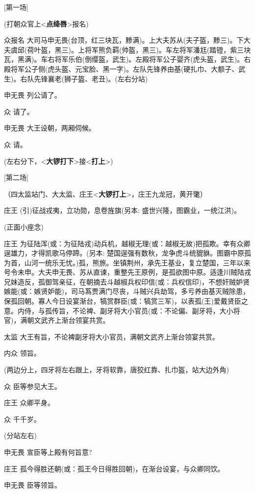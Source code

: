 {[}第一场{]}

(打朝众官上\textless{}\textbf{点绛唇}\textgreater{}报名)

众报名
大司马申无畏(台顶，红三块瓦，黪满)。上大夫苏从(夫子盔，黪三)。下大夫虞邱(荷叶盔，黑三)。上将军熊负羁(帅盔，黑三)。车左将军潘尪(踏镫，紫三块瓦，黑满)。车右将军乐伯(倒缨盔，武生)。左殿将军公子婴齐(虎头盔，武生)。右殿将军公子侧(虎头盔、元宝脸、黑一字)。左队先锋养由基(硬扎巾、大额子、武生)。右队先锋襄老(狮子盔、老丑)。(左右分站)

申无畏 列公请了。

众 请了。

申无畏 大王设朝，两厢伺候。

众 请。

(左右分下，\textless{}\textbf{大锣打下}\textgreater{}接\textless{}\textbf{打上}\textgreater{})

{[}第二场{]}

（四太监站门、大太监、庄王\textless{}\textbf{大锣打上}\textgreater{}，庄王九龙冠，黄开氅）

庄王 (引)征战戎夷，立功勋，息卷旌旗(另本: 盛世兴隆，图霸业，一统江洪)。

(正面小座念)

庄王
为征陆浑(或：为征陆戎)动兵机，越椒无理(或：越椒无故)把孤欺。幸有众卿逞雄力，才得凯歌马停蹄。(另本:
楚国逞强有数秋，龙争虎斗统貔貅。图霸中原孤为首，山河一统乐无忧。)孤，熊旅。坐镇荆州，承先王基业，复立楚国，三年以来号令未申。大夫申无畏、苏从直谏，重整先王原例，是孤欲图中原。适逢川贼陆戎兄妹造反，孤御驾亲征，在朝摘去斗越椒兵权印信(或：兵权信印)，不想奸贼妒贤嫉能(或：嫉贤妒能)，司马蒍贾满门尽丧，斗贼兴兵劫驾，多亏养由基灭贼除患，保孤回朝。寡人今日设宴渐台，犒赏群臣(或：犒赏三军)，以表孤(王)爱戴贤臣之意。内侍，与孤传旨，不论裨、副牙将大小官员(或：不论偏、副牙将，大小将官)，满朝文武齐上渐台领宴共赏。

太监 大王有旨，不论裨副牙将大小官员，满朝文武齐上渐台领宴共赏。

内众 领旨。

(两边分上，四牙将左右跟上，牙将软靠，唐狡红靠、扎巾盔，站大边外角)

众 臣等参见大王。

庄王 众卿平身。

众 千千岁。

(分站左右)

申无畏 宣臣等上殿有何旨意?

庄王 孤今得胜还朝(或：孤王今日得胜回朝)，在渐台设宴，与众卿同饮。

申无畏 臣等领旨。


